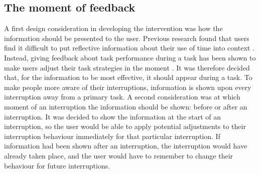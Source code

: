 \subsection{The moment of feedback}
A first design consideration in developing the intervention was how the information should be presented to the user. Previous research found that users find it difficult to put reflective information about their use of time into context \citep{Collins2014, Whittaker2016}. Instead, giving feedback about task performance during a task has been shown to make users adjust their task strategies in the moment \citep{Maior2018, Gould2016a, Whittaker2016}. It was therefore decided that, for the information to be most effective, it should appear during a task. To make people more aware of their interruptions, information is shown upon every interruption away from a primary task. 
A second consideration was at which moment of an interruption the information should be shown: before or after an interruption. It was decided to show the information at the start of an interruption, so the user would be able to apply potential adjustments to their interruption behaviour immediately for that particular interruption. If information had been shown after an interruption, the interruption would have already taken place, and the user would have to remember to change their behaviour for future interruptions.

